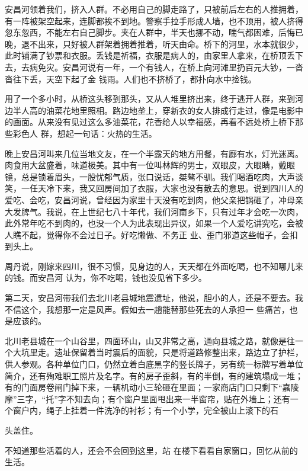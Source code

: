 \documentclass{article}
\begin{document}
安昌河领着我们，挤入人群。不必用自己的脚走路了，只被前后左右的人推拥着，有一阵被架空起来，连脚都挨不到地。警察手拉手形成人墙，也不顶用，被人挤得忽东忽西，不能左右自己脚步。夹在人群中，半天也挪不动，喘气都困难，后悔已晚，退不出来，只好被人群架着拥着推着，听天由命。桥下的河里，水本就很少，此时铺满了钞票和衣服。丢钱是祈福，衣服是病人的，由家里人拿来，在桥顶丢下去，去病免灾。安昌河说有一年，一个有钱人，在桥上向河滩里扔百元大钞，一沓沓往下丢，天空下起了金
钱雨。人们也不挤桥了，都扑向水中捡钱。 

\newpage

用了一个多小时，从桥这头移到那头，又从人堆里挤出来，终于逃开人群，来到河边半人高的油菜花地里照相。路边地垄上，穿新衣的女人排成行走过，像是电影中的画面。从来没有见过这么多油菜花，花香给人以幸福感，再看不远处桥上桥下那些彩色人
群，想起一句话：火热的生活。 

晚上安昌河叫来几位当地文友，在一个半露天的地方用餐，有廊有水，灯光迷离。肉食用大盆盛着，味道极美。其中有一位叫林辉的男士，双眼皮，大眼睛，戴眼镜，总是锁着眉头，一股忧郁气质，张口说话，桀骜不驯。我们喝酒吃肉，大声谈笑，一任天冷下来，我又回房间加了衣服，大家也没有散去的意思。说到四川人的爱吃、会吃，安昌河说，曾经因为家里十天没有吃到肉，他父亲把锅砸了，冲母亲大发脾气。我说，在上世纪七八十年代，我们河南乡下，只有过年才会吃一次肉，此外常年吃不到肉的，也没一个人为此表现出异议，如果一个人爱吃讲究吃，会被人瞧不起，觉得你不会过日子。好吃懒做、不务正
业、歪门邪道这些帽子，会扣到头上。 

\newpage

周丹说，刚嫁来四川，很不习惯，见身边的人，天天都在外面吃喝，也不知哪儿来的钱。而安昌河
认为，你不吃喝，钱也没见省下多少。 

第二天，安昌河带我们去北川老县城地震遗址，他说，胆小的人，还是不要去。我不信这个，我想那一定是风声。假如去一趟能替那些死去的人承担一
些痛苦，也是应该的。 

北川老县城在一个山谷里，四面环山，山又非常之高，通向县城之路，就像是往一个大坑里走。遗址保留着当时震后的面貌，只是将道路修整出来，路边立了护栏，供人参观。各种单位门口，仍然立着白底黑字的竖长牌子，另有统一标牌写着单位简介，还有殉难职工照片及名字。有的房子歪斜，有的半倒，有的建筑塌成一堆；有的门面房卷闸门掉下来，一辆机动小三轮砸在里面；一家商店门口只剩下“嘉陵摩”三字，“托”字不知去向；有个窗户里面甩出来一半窗帘，贴在外墙上；还有一个窗户内，绳子上挂着一件洗净的衬衫；有一个小学，完全被山上滚下的石

\newpage
头盖住。 

不知道那些活着的人，还会不会回到这里，站
在楼下看看自家窗口，回忆从前的生活。 
\end{document}
